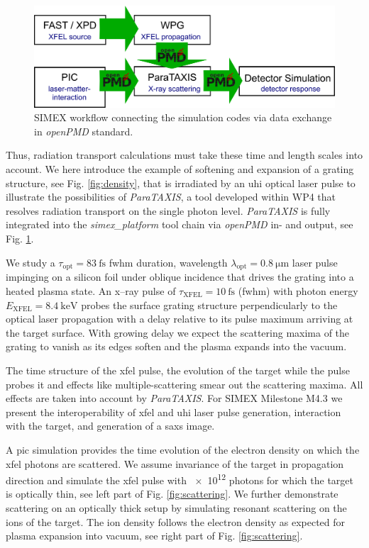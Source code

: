 \begin{figure}
\centering
  \includegraphics[width=.85\linewidth]{figures/simex_workflow_v2.png}
\caption{
SIMEX workflow connecting the simulation codes via data exchange in \textit{openPMD} standard.
}
  \label{fig:workflows}
\end{figure}

Thus, radiation transport calculations must take these time and length scales
into account. We here introduce the example of softening and expansion of a
grating structure, see Fig. \ref{fig:density},  that is irradiated by an \gls{uhi}
optical laser pulse to illustrate the possibilities of \textit{ParaTAXIS}, a tool
developed within WP4 that resolves radiation transport on the single photon
level. \textit{ParaTAXIS} is fully integrated into the \textit{simex\_platform} tool chain via
\textit{openPMD} \cite{Huebl2017} in- and output, see Fig. \ref{fig:workflows}.

We study a $\tau_\mathrm{opt} = \SI{83}{\fs}$ \gls{fwhm} duration, wavelength $\lambda_\mathrm{opt} =
\SI{0.8}{\micro\metre}$ laser pulse impinging on a silicon foil under oblique incidence
that drives the grating into a heated plasma state. An x--ray pulse of
$\tau_\mathrm{XFEL} = \SI{10}{\fs}$ (\gls{fwhm}) with photon energy
$E_\mathrm{XFEL} = \SI{8.4}{\kilo\electronvolt}$ probes the surface grating structure
perpendicularly to the optical laser propagation with a delay relative to its
pulse maximum arriving at the target surface. With growing delay we expect the
scattering maxima of the grating to vanish as its edges soften and the plasma
expands into the vacuum.

The time structure of the \gls{xfel} pulse, the evolution of the target while the
pulse probes it and effects like multiple-scattering smear out the scattering
maxima. All effects are taken into account by \textit{ParaTAXIS}. For SIMEX
Milestone M4.3
we present the interoperability of \gls{xfel} and \gls{uhi} laser pulse generation,
interaction with the target, and generation of a \gls{saxs} image.

A \gls{pic} simulation provides the time
evolution of the electron density on which the \gls{xfel} photons are scattered. We
assume invariance of the target in propagation direction and simulate the \gls{xfel}
pulse with \num{e12} photons for which the target is optically thin,
see left part of Fig. \ref{fig:scattering}. We further demonstrate
scattering on an optically thick setup by simulating
resonant scattering on the ions of the target. The ion density follows the
electron density as expected for plasma expansion into vacuum\cite{Mora2003},
see right part of Fig. \ref{fig:scattering}.

